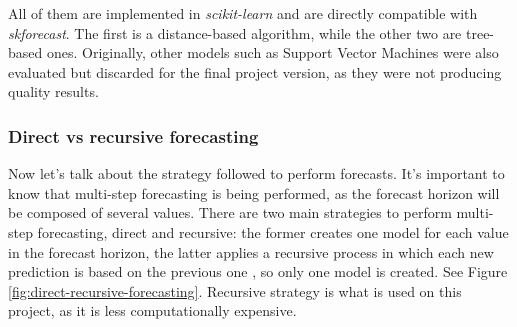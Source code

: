 All of them are implemented in \textit{scikit-learn} and are directly compatible with \textit{skforecast}. The first is a distance-based algorithm, while the other two are tree-based ones. Originally, other models such as Support Vector Machines were also evaluated but discarded for the final project version, as they were not producing quality results.

\subsubsection{Direct vs recursive forecasting}
Now let's talk about the strategy followed to perform forecasts. It's important to know that multi-step forecasting is being performed, as the forecast horizon will be composed of several values. There are two main strategies to perform multi-step forecasting, direct and recursive: the former creates one model for each value in the forecast horizon, the latter applies a recursive process in which each new prediction is based on the previous one \cite{direct-recursive-forecasting}, so only one model is created. See Figure \ref{fig:direct-recursive-forecasting}. Recursive strategy is what is used on this project, as it is less computationally expensive.

